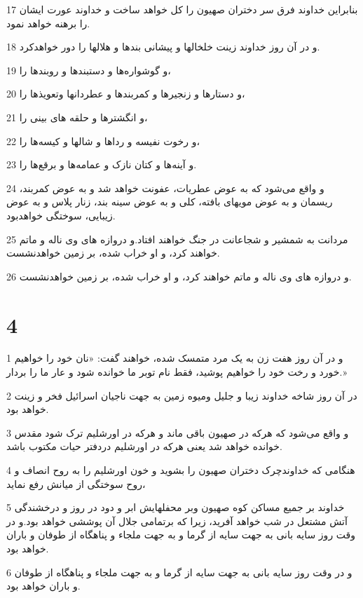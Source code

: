 \par 17 بنابراین خداوند فرق سر دختران صهیون را کل خواهد ساخت و خداوند عورت ایشان را برهنه خواهد نمود.
\par 18 و در آن روز خداوند زینت خلخالها و پیشانی بندها و هلالها را دور خواهدکرد.
\par 19 و گوشواره‌ها و دستبندها و روبندها را،
\par 20 و دستارها و زنجیرها و کمربندها و عطردانها وتعویذها را،
\par 21 و انگشترها و حلقه های بینی را،
\par 22 و رخوت نفیسه و رداها و شالها و کیسه‌ها را،
\par 23 و آینه‌ها و کتان نازک و عمامه‌ها و برقع‌ها را.
\par 24 و واقع می‌شود که به عوض عطریات، عفونت خواهد شد و به عوض کمربند، ریسمان و به عوض مویهای بافته، کلی و به عوض سینه بند، زنار پلاس و به عوض زیبایی، سوختگی خواهدبود.
\par 25 مردانت به شمشیر و شجاعانت در جنگ خواهند افتاد.و دروازه های وی ناله و ماتم خواهند کرد، و او خراب شده، بر زمین خواهدنشست.
\par 26 و دروازه های وی ناله و ماتم خواهند کرد، و او خراب شده، بر زمین خواهدنشست.
 
\chapter{4}

\par 1 و در آن روز هفت زن به یک مرد متمسک شده، خواهند گفت: «نان خود را خواهیم خورد و رخت خود را خواهیم پوشید، فقط نام توبر ما خوانده شود و عار ما را بردار.»
\par 2 در آن روز شاخه خداوند زیبا و جلیل ومیوه زمین به جهت ناجیان اسرائیل فخر و زینت خواهد بود.
\par 3 و واقع می‌شود که هرکه در صهیون باقی ماند و هر‌که در اورشلیم ترک شود مقدس خوانده خواهد شد یعنی هرکه در اورشلیم دردفتر حیات مکتوب باشد.
\par 4 هنگامی که خداوندچرک دختران صهیون را بشوید و خون اورشلیم را به روح انصاف و روح سوختگی از میانش رفع نماید،
\par 5 خداوند بر جمیع مساکن کوه صهیون وبر محفلهایش ابر و دود در روز و درخشندگی آتش مشتعل در شب خواهد آفرید، زیرا که برتمامی جلال آن پوششی خواهد بود.و در وقت روز سایه بانی به جهت سایه از گرما و به جهت ملجاء و پناهگاه از طوفان و باران خواهد بود.
\par 6 و در وقت روز سایه بانی به جهت سایه از گرما و به جهت ملجاء و پناهگاه از طوفان و باران خواهد بود.
 
